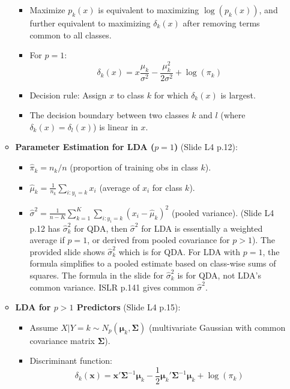 \documentclass[12pt,a4paper]{article}
\begin{document}
\begin{itemize}
\begin{itemize}
                \begin{itemize}
                    \item Maximize $p_k(x)$ is equivalent to maximizing $\log(p_k(x))$, and further equivalent to maximizing $\delta_k(x)$ after removing terms common to all classes.
                    \item For $p=1$:
                        $$ \delta_k(x) = x \frac{\mu_k}{\sigma^2} - \frac{\mu_k^2}{2\sigma^2} + \log(\pi_k) $$
                    \item Decision rule: Assign $x$ to class $k$ for which $\delta_k(x)$ is largest.
                    \item The decision boundary between two classes $k$ and $l$ (where $\delta_k(x) = \delta_l(x)$) is linear in $x$.
                \end{itemize}
            \item \textbf{Parameter Estimation for LDA ($p=1$)} (Slide L4 p.12):
                \begin{itemize}
                    \item $\hat{\pi}_k = n_k/n$ (proportion of training obs in class $k$).
                    \item $\hat{\mu}_k = \frac{1}{n_k} \sum_{i: y_i=k} x_i$ (average of $x_i$ for class $k$).
                    \item $\hat{\sigma}^2 = \frac{1}{n-K} \sum_{k=1}^K \sum_{i: y_i=k} (x_i - \hat{\mu}_k)^2$ (pooled variance).
                        (Slide L4 p.12 has $\hat{\sigma}^2_k$ for QDA, then $\hat{\sigma}^2$ for LDA is essentially a weighted average if $p=1$, or derived from pooled covariance for $p>1$). The provided slide shows $\hat{\sigma}^2_k$ which is for QDA. For LDA with $p=1$, the formula simplifies to a pooled estimate based on class-wise sums of squares. The formula in the slide for $\hat{\sigma}^2_k$ is for QDA, not LDA's common variance. ISLR p.141 gives common $\hat{\sigma}^2$.
                \end{itemize}
            \item \textbf{LDA for $p>1$ Predictors} (Slide L4 p.15):
                \begin{itemize}
                    \item Assume $X|Y=k \sim N_p(\boldsymbol{\mu}_k, \boldsymbol{\Sigma})$ (multivariate Gaussian with common covariance matrix $\boldsymbol{\Sigma}$).
                    \item Discriminant function:
                        $$ \delta_k(\mathbf{x}) = \mathbf{x}'\boldsymbol{\Sigma}^{-1}\boldsymbol{\mu}_k - \frac{1}{2}\boldsymbol{\mu}_k'\boldsymbol{\Sigma}^{-1}\boldsymbol{\mu}_k + \log(\pi_k) $$

\end{itemize}
\end{itemize}
\end{itemize}
\end{document}
